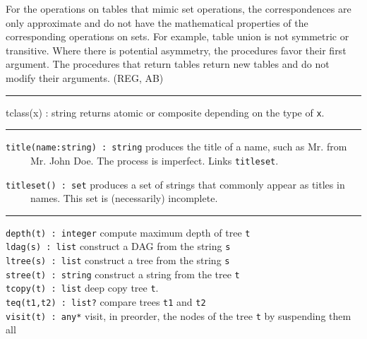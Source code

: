 For the operations on tables that mimic set operations, the
correspondences are only approximate and do not have the mathematical
properties of the corresponding operations on sets. For example, table
{\textquotedbl}union{\textquotedbl} is not symmetric or transitive.
Where there is potential asymmetry, the procedures
{\textquotedbl}favor{\textquotedbl} their first argument. The
procedures that return tables return new tables and do not modify their
arguments. (REG, AB)

\vspace{0.25cm}\hrule{}

\textsf{tclass(x) : string} returns {\textquotedbl}atomic{\textquotedbl}
or {\textquotedbl}composite{\textquotedbl} depending on the type of
\texttt{x}. 

\vspace{0.25cm}\hrule{}

\texttt{title(name:string) : string} produces the title of a name, such
as {\textquotedbl}Mr.{\textquotedbl} from\\
 \ \ \ \ \ {\textquotedbl}Mr. John Doe{\textquotedbl}. The process is
imperfect. Links \texttt{titleset}.

\texttt{titleset() : set} produces a set of strings that commonly appear
as titles in\\
 \ \ \ \ \ names. This set is (necessarily) incomplete. 

\vspace{0.25cm}\hrule{}

\texttt{depth(t) : integer} compute maximum depth of tree
\texttt{t}\\
\texttt{ldag(s) : list} construct a DAG from the string
\texttt{s}\\
\texttt{ltree(s) : list} construct a tree from the string
\texttt{s}\\
\texttt{stree(t) : string} construct a string from the tree
\texttt{t}\\
\texttt{tcopy(t) : list} deep copy tree \texttt{t}.\\
\texttt{teq(t1,t2) : list?} compare trees \texttt{t1} and
\texttt{t2}\\
\texttt{visit(t) : any*} visit, in preorder, the nodes of the tree
\texttt{t} by suspending them all 

